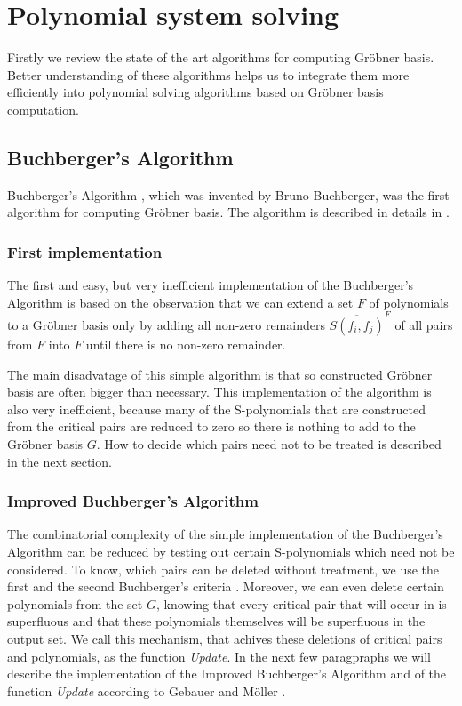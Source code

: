 \chapter{Polynomial system solving}
Firstly we review the state of the art algorithms for computing Gr\"obner basis. Better understanding of these algorithms helps us to integrate them more efficiently into polynomial solving algorithms based on Gr\"obner basis computation.

\section{Buchberger's Algorithm}
Buchberger's Algorithm \cite{Buchberger65}, which was invented by Bruno Buchberger, was the first algorithm for computing Gr\"obner basis. The algorithm is described in details in \cite{Becker93, Cox-Little-Shea97}.

\subsection{First implementation}
The first and easy, but very inefficient implementation of the Buchberger's Algorithm is based on the observation that we can extend a set $F$ of polynomials to a Gr\"obner basis only by adding all non-zero remainders $\overline{S(f_i, f_j)}^F$ of all pairs from $F$ into $F$ until there is no non-zero remainder.

The main disadvatage of this simple algorithm is that so constructed Gr\"obner basis are often bigger than necessary. This implementation of the algorithm is also very inefficient, because many of the S-polynomials that are constructed from the critical pairs are reduced to zero so there is nothing to add to the Gr\"obner basis $G$. How to decide which pairs need not to be treated is described in the next section.



\subsection{Improved Buchberger's Algorithm}
\label{subsec:ImprovedBuchberger}
The combinatorial complexity of the simple implementation of the Buchberger's Algorithm can be reduced by testing out certain S-polynomials which need not be considered. To know, which pairs can be deleted without treatment, we use the first and the second Buchberger's criteria \cite{Becker93}. Moreover, we can even delete certain polynomials from the set $G$, knowing that every critical pair that will occur in is superfluous and that these polynomials themselves will be superfluous in the output set. We call this mechanism, that achives these deletions of critical pairs and polynomials, as the function \textit{Update}.  In the next few paragpraphs we will describe the implementation of the Improved Buchberger's Algorithm and of the function \textit{Update} according to Gebauer and M\"oller \cite{Gebauer-Moller88}.

